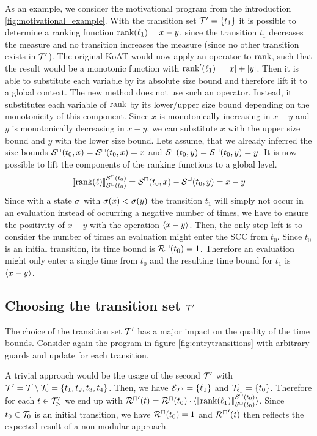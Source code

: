 As an example, we consider the motivational program from the introduction \ref{fig:motivational_example}.
With the transition set $\mathcal{T}' = \lbrace t_1 \rbrace$ it is possible to determine a ranking function $\text{rank}(\ell_1) = x - y$, since the transition $t_1$ decreases the measure and no transition increases the measure (since no other transition exists in $\mathcal{T}'$).
The original KoAT would now apply an operator to $\text{rank}$, such that the result would be a monotonic function with $\text{rank}'(\ell_1) = \left|x\right| + \left|y\right|$.
Then it is able to substitute each variable by its absolute size bound and therefore lift it to a global context.
The new method does not use such an operator.
Instead, it substitutes each variable of $\text{rank}$ by its lower/upper size bound depending on the monotonicity of this component.
Since $x$ is monotonically increasing in $x-y$ and $y$ is monotonically decreasing in $x-y$, we can substitute $x$ with the upper size bound and $y$ with the lower size bound.
Lets assume, that we already inferred the size bounds ${\mathcal{S}^\sqcap}(t_0,x) = {\mathcal{S}^\sqcup}(t_0,x) = x$ and ${\mathcal{S}^\sqcap}(t_0,y) = {\mathcal{S}^\sqcup}(t_0,y) = y$.
It is now possible to lift the components of the ranking functions to a global level.
\[ \llbracket \text{rank}(\ell) \rrbracket_{{\mathcal{S}^\sqcup}(t_0)}^{{\mathcal{S}^\sqcap}(t_0)} = {\mathcal{S}^\sqcap}(t_0, x) - {\mathcal{S}^\sqcup}(t_0, y) = x - y \]
Since with a state $\sigma$ with $\sigma(x) < \sigma(y)$ the transition $t_1$ will simply not occur in an evaluation instead of occurring a negative number of times, we have to ensure the positivity of $x - y$ with the operation $\langle x - y\rangle$.
Then, the only step left is to consider the number of times an evaluation might enter the SCC from $t_0$.
Since $t_0$ is an initial transition, its time bound is ${\mathcal{R}^\sqcap}(t_0) = 1$.
Therefore an evaluation might only enter a single time from $t_0$ and the resulting time bound for $t_1$ is $\langle x - y\rangle$.

\subsection{Choosing the transition set $\mathcal{T}'$}

The choice of the transition set $\mathcal{T}'$ has a major impact on the quality of the time bounds.
Consider again the program in figure \ref{fig:entrytransitions} with arbitrary guards and update for each transition.

A trivial approach would be the usage of the second $\mathcal{T}'$ with $\mathcal{T}' = \mathcal{T} \setminus \mathcal{T}_0 = \lbrace t_1, t_2, t_3, t_4 \rbrace$.
Then, we have $\mathcal{E}_{\mathcal{T}'} = \lbrace \ell_1 \rbrace$ and $\mathcal{T}_{\ell_1} = \lbrace t_0 \rbrace$.
Therefore for each $t \in \mathcal{T}'_>$ we end up with ${\mathcal{R}^\sqcap}'(t) = {\mathcal{R}^\sqcap}(t_0) \cdot \langle\llbracket \text{rank}(\ell_1) \rrbracket_{{\mathcal{S}^\sqcup}(t_0)}^{{\mathcal{S}^\sqcap}(t_0)}\rangle$.
Since $t_0 \in \mathcal{T}_0$ is an initial transition, we have ${\mathcal{R}^\sqcap}(t_0) = 1$ and ${\mathcal{R}^\sqcap}'(t)$ then reflects the expected result of a non-modular approach.

